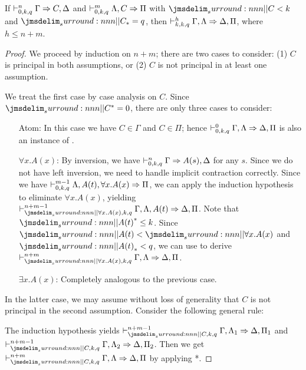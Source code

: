 \documentclass[a4paper]{article}
\begin{document}
\begin{lemma}\label{0004}
  If $\dVdash{n}{0}{k}{q} \Gamma \Rightarrow C,\Delta$ and $\dVdash{m}{0}{k}{q} \Lambda,C \Rightarrow \Pi$ with $\cRank{C} < k$ and $\qRank{C} = q$, then $\dVdash{h}{k}{k}{q} \Gamma,\Lambda \Rightarrow \Delta,\Pi$, where $h \leq n + m$.
\end{lemma}
\begin{proof}
  We proceed by induction on $n + m$; there are two cases to consider: (1) $C$ is principal in both assumptions, or (2) $C$ is not principal in at least one assumption.

  We treat the first case by case analysis on $C$.
  Since $\dRank{C} = 0$, there are only three cases to consider:
  \begin{itemize}
  \item[Atom:] In this case we have $C \in \Gamma$ and $C \in \Pi$; hence $\dVdash{0}{0}{k}{q} \Gamma,\Lambda \Rightarrow \Delta,\Pi$ is also an instance of \rId.
  \item[$\forall x.A(x)$:] By inversion, we have $\dVdash{n}{0}{k}{q} \Gamma \Rightarrow A(s),\Delta$ for any $s$.
    Since we do not have left inversion, we need to handle implicit contraction correctly.
    Since we have $\dVdash{m-1}{0}{k}{q} \Lambda,A(t),\forall x.A(x) \Rightarrow \Pi$, we can apply the induction hypothesis to eliminate $\forall x.A(x)$, yielding $\dVdash{n+m-1}{\cRank{\forall x.A(x)}}{k}{q} \Gamma,\Lambda,A(t) \Rightarrow \Delta,\Pi$.
    Note that $\dRank{A(t)} \leq k$.
    Since $\cRank{A(t)} < \cRank{\forall x.A(x)}$ and $\qRank{A(t)} < q$, we can use \rCut{} to derive $\dVdash{n+m}{\cRank{\forall x.A(x)}}{k}{q} \Gamma,\Lambda \Rightarrow \Delta,\Pi$.
  \item[$\exists x.A(x)$:] Completely analogous to the previous case.
  \end{itemize}
  In the latter case, we may assume without loss of generality that $C$ is not principal in the second assumption.
  Consider the following general rule:
  \begin{mathpar}
  \end{mathpar}
  The induction hypothesis yields $\dVdash{n+m-1}{\cRank{C}}{k}{q} \Gamma,\Lambda_1 \Rightarrow \Delta,\Pi_1$ and $\dVdash{n+m-1}{\cRank{C}}{k}{q} \Gamma,\Lambda_2 \Rightarrow \Delta,\Pi_2$.
  Then we get $\dVdash{n+m}{\cRank{C}}{k}{q} \Gamma,\Lambda \Rightarrow \Delta,\Pi$ by applying *.
\end{proof}
\end{document}
